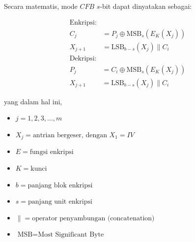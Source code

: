 \documentclass{article}
\begin{document}

Secara matematis, mode $CFB$ $s$-bit dapat dinyatakan sebagai:

\begin{align*}
\text{Enkripsi:}\\ C_j &= P_j \oplus \text{MSB}_s(E_K(X_j)) \\
X_{j+1} &= \text{LSB}_{b-s}(X_j) \parallel C_i
\end{align*}
\begin{align*}
\text{Dekripsi:}\\ P_j &= C_i \oplus \text{MSB}_s(E_K(X_j)) \\
X_{j+1} &= \text{LSB}_{b-s}(X_j) \parallel C_i
\end{align*}

yang dalam hal ini,
\begin{itemize}
    \item $j = 1, 2, 3, ..., m$
    \item $X_j = \text{antrian bergeser, dengan } X_1 = IV$
    \item $E = \text{fungsi enkripsi}$
    \item $K = \text{kunci}$
    \item $b = \text{panjang blok enkripsi}$
    \item $s = \text{panjang unit enkripsi}$
    \item $\parallel = \text{operator penyambungan (concatenation)}$
    \item $\text{MSB} = \text{Most Significant Byte}$
\end{itemize}
\end{document}
